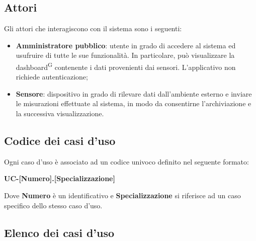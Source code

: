 \documentclass[8pt]{article}
\newcommand{\glossterm}[1]{#1\textsuperscript{G}} %
\begin{document}
\subsection{Attori}
Gli attori che interagiscono con il sistema sono i seguenti:
\begin{itemize}
    \item \textbf{Amministratore pubblico}: utente in grado di accedere al sistema ed usufruire di tutte le sue funzionalità. In particolare, può visualizzare la \glossterm{dashboard} contenente i dati provenienti dai sensori. L'applicativo non richiede autenticazione; %
    \item \textbf{Sensore}: dispositivo in grado di rilevare dati dall'ambiente esterno e inviare le misurazioni effettuate al sistema, in modo da consentirne l'archiviazione e la successiva visualizzazione.
\end{itemize}
\clearpage
\subsection{Codice dei casi d'uso}
Ogni caso d'uso è associato ad un codice univoco definito nel seguente formato:
\begin{center}
    \textbf{UC-[Numero].[Specializzazione]}
\end{center}
Dove \textbf{Numero} è un identificativo e \textbf{Specializzazione} si riferisce ad un caso specifico
dello stesso caso d'uso.

\subsection{Elenco dei casi d'uso}
\end{document}
